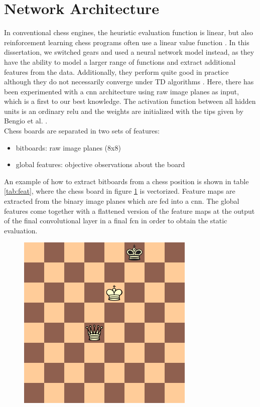 \documentclass[twocolumn]{phdsymp} %
\begin{document}
\section{Network Architecture}
\label{sec:nn}
In conventional chess engines, the heuristic evaluation function is linear, but also reinforcement learning chess programs often use a linear value function \cite{knightcap,meep}. In this dissertation, we switched gears and used a neural network model instead, as they have the ability to model a larger range of functions and extract additional features from the data. Additionally, they perform quite good in practice although they do not necessarily converge under TD algorithms \cite{convergence}. Here, there has been experimented with a \gls{cnn} architecture using raw image planes as input, which is a first to our best knowledge. The activation function between all hidden units is an ordinary \gls{relu} and the weights are initialized with the tips given by Bengio et al. \cite{init}.\\

Chess boards are separated in two sets of features:
\begin{itemize}
\item bitboards: raw image planes (8x8)
\item global features: objective observations about the board 
\end{itemize}
An example of how to extract bitboards from a chess position is shown in table \ref{tab:feat}, where the chess board in figure \ref{fig:diagram} is vectorized. Feature maps are extracted from the binary image planes which are fed into a \gls{cnn}. The global features come together with a flattened version of the feature maps at the output of the final convolutional layer in a final \gls{fcn} in order to obtain the static evaluation.

\begin{figure}
\centering
\includegraphics[scale=0.5]{diagram}
\caption{}
\label{fig:diagram}
\end{figure}
\end{document}
